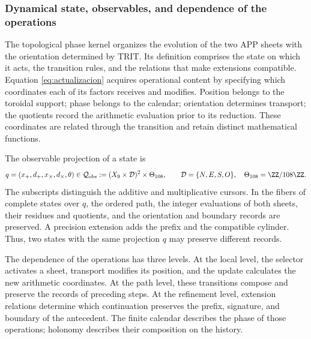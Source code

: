 
\subsubsection{Dynamical state, observables, and dependence of the operations}
\label{tpk-int:estado}

The topological phase kernel organizes the evolution of the two APP sheets
with the orientation determined by TRIT. Its definition comprises the state
on which it acts, the transition rules, and the relations that make
extensions compatible. Equation \eqref{eq:actualizacion} acquires
operational content by specifying which coordinates each of its factors receives
and modifies. Position belongs to the toroidal support; phase
belongs to the calendar; orientation determines transport; the
quotients record the arithmetic evaluation prior to its reduction.
These coordinates are related through the transition and retain distinct
mathematical functions.

The observable projection of a state is
\begin{equation}
 q=(x_+,d_+,x_\times,d_\times,\theta)
 \in\mathcal Q_{\rm obs}
 :=(X_9\times\mathcal D)^2\times\Theta_{108},
 \qquad \mathcal D=\{N,E,S,O\},\quad
 \Theta_{108}=\ZZ/108\ZZ.
 \label{tpk-int:qobs}
\end{equation}
The subscripts distinguish the additive and multiplicative cursors. In the
fibers of complete states over \(q\), the ordered path, the integer evaluations
of both sheets, their residues and quotients, and the orientation and boundary
records are preserved. A precision extension adds the
prefix and the compatible cylinder. Thus, two states with the same
projection \(q\) may preserve different records.

The dependence of the operations has three levels. At the local level,
the selector activates a sheet, transport modifies its position, and the
update calculates the new arithmetic coordinates. At the path level,
these transitions compose and preserve the records of
preceding steps. At the refinement level, extension relations
determine which continuation preserves the prefix, signature, and
boundary of the antecedent. The finite calendar describes the phase of those
operations; holonomy describes their composition on the history.

